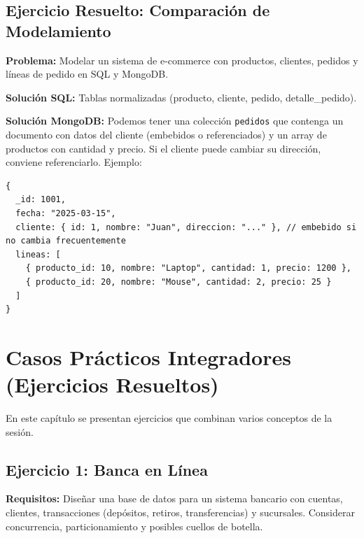 \documentclass[12pt,a4paper,openany,oneside]{book}
\begin{document}
\section{Ejercicio Resuelto: Comparación de Modelamiento}
\textbf{Problema:} Modelar un sistema de e-commerce con productos, clientes, pedidos y líneas de pedido en SQL y MongoDB.

\textbf{Solución SQL:} Tablas normalizadas (producto, cliente, pedido, detalle\_pedido).

\textbf{Solución MongoDB:} Podemos tener una colección \texttt{pedidos} que contenga un documento con datos del cliente (embebidos o referenciados) y un array de productos con cantidad y precio. Si el cliente puede cambiar su dirección, conviene referenciarlo. Ejemplo:
\begin{lstlisting}
{
  _id: 1001,
  fecha: "2025-03-15",
  cliente: { id: 1, nombre: "Juan", direccion: "..." }, // embebido si no cambia frecuentemente
  lineas: [
    { producto_id: 10, nombre: "Laptop", cantidad: 1, precio: 1200 },
    { producto_id: 20, nombre: "Mouse", cantidad: 2, precio: 25 }
  ]
}
\end{lstlisting}

\chapter{Casos Prácticos Integradores (Ejercicios Resueltos)}
En este capítulo se presentan ejercicios que combinan varios conceptos de la sesión.

\section{Ejercicio 1: Banca en Línea}
\textbf{Requisitos:} Diseñar una base de datos para un sistema bancario con cuentas, clientes, transacciones (depósitos, retiros, transferencias) y sucursales. Considerar concurrencia, particionamiento y posibles cuellos de botella.
\end{document}
